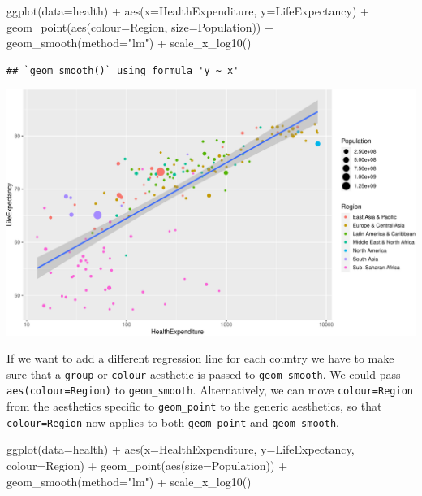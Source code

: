 \documentclass[
]{book}
\newenvironment{Shaded}{\begin{snugshade}}{\end{snugshade}}
\newcommand{\AttributeTok}[1]{\textcolor[rgb]{0.77,0.63,0.00}{#1}}
\newcommand{\FunctionTok}[1]{\textcolor[rgb]{0.00,0.00,0.00}{#1}}
\newcommand{\NormalTok}[1]{#1}
\newcommand{\SpecialCharTok}[1]{\textcolor[rgb]{0.00,0.00,0.00}{#1}}
\newcommand{\StringTok}[1]{\textcolor[rgb]{0.31,0.60,0.02}{#1}}
\begin{document}
\begin{Shaded}
\begin{Highlighting}[]
\FunctionTok{ggplot}\NormalTok{(}\AttributeTok{data=}\NormalTok{health) }\SpecialCharTok{+} 
    \FunctionTok{aes}\NormalTok{(}\AttributeTok{x=}\NormalTok{HealthExpenditure,  }\AttributeTok{y=}\NormalTok{LifeExpectancy) }\SpecialCharTok{+}
    \FunctionTok{geom\_point}\NormalTok{(}\FunctionTok{aes}\NormalTok{(}\AttributeTok{colour=}\NormalTok{Region, }\AttributeTok{size=}\NormalTok{Population)) }\SpecialCharTok{+}
    \FunctionTok{geom\_smooth}\NormalTok{(}\AttributeTok{method=}\StringTok{"lm"}\NormalTok{)  }\SpecialCharTok{+}
    \FunctionTok{scale\_x\_log10}\NormalTok{()}
\end{Highlighting}
\end{Shaded}

\begin{verbatim}
## `geom_smooth()` using formula 'y ~ x'
\end{verbatim}

\includegraphics[width=\textwidth]{bookdown-demo_files/figure-latex/unnamed-chunk-54-1}

If we want to add a different regression line for each country we have to make sure that a \texttt{group} or \texttt{colour} aesthetic is passed to \texttt{geom\_smooth}. We could pass \texttt{aes(colour=Region)} to \texttt{geom\_smooth}. Alternatively, we can move \texttt{colour=Region} from the aesthetics specific to \texttt{geom\_point} to the generic aesthetics, so that \texttt{colour=Region} now applies to both \texttt{geom\_point} and \texttt{geom\_smooth}.

\begin{Shaded}
\begin{Highlighting}[]
\FunctionTok{ggplot}\NormalTok{(}\AttributeTok{data=}\NormalTok{health) }\SpecialCharTok{+} 
    \FunctionTok{aes}\NormalTok{(}\AttributeTok{x=}\NormalTok{HealthExpenditure,  }\AttributeTok{y=}\NormalTok{LifeExpectancy, }\AttributeTok{colour=}\NormalTok{Region) }\SpecialCharTok{+}
    \FunctionTok{geom\_point}\NormalTok{(}\FunctionTok{aes}\NormalTok{(}\AttributeTok{size=}\NormalTok{Population)) }\SpecialCharTok{+}
    \FunctionTok{geom\_smooth}\NormalTok{(}\AttributeTok{method=}\StringTok{"lm"}\NormalTok{)  }\SpecialCharTok{+}
    \FunctionTok{scale\_x\_log10}\NormalTok{()}
\end{Highlighting}
\end{Shaded}
\end{document}
